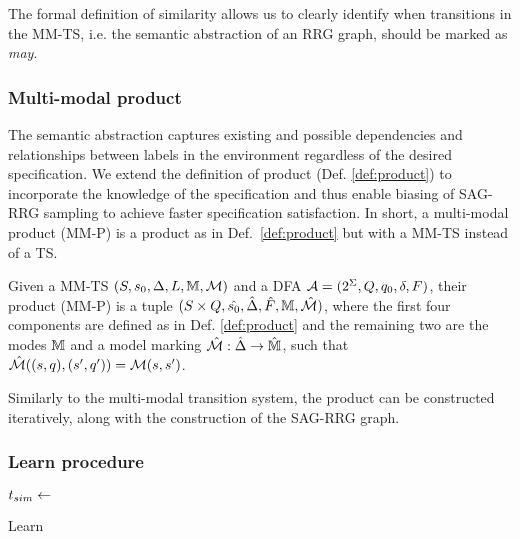 \medskip

The formal definition of similarity allows us to clearly identify when transitions in the MM-TS, i.e. the semantic abstraction of an RRG graph, should be marked as \emph{may}.

\medskip

\subsubsection{Multi-modal product}

The semantic abstraction captures existing and possible dependencies and relationships between labels in the environment regardless of the desired specification. We extend the definition of product (Def. \ref{def:product}) to incorporate the knowledge of the specification and thus enable biasing of SAG-RRG sampling to achieve faster specification satisfaction. In short, a multi-modal product (MM-P) is a product as in Def.~\ref{def:product} but with a MM-TS instead of a TS.

\begin{definition}
    Given a MM-TS $(S,s_0,\Delta,L,\mathbb{M},\mathcal{M})$ and a DFA $\mathcal{A}=(2^\Sigma,Q,q_0,\delta,F)$, their product (MM-P) is a tuple $(S\times Q,\hat{s_0},\hat{\Delta},\hat F, \mathbb{M}, \hat {\mathcal{M}})$, where the first four components are defined as in Def. \ref{def:product} and the remaining two are the modes $\mathbb{M}$ and a model marking $\hat {\mathcal{M}}: \hat \Delta \rightarrow \hat {\mathbb{M}}$, such that $\hat {\mathcal{M}}((s,q),(s',q')) = \mathcal{M}(s, s')$.
\end{definition}

Similarly to the multi-modal transition system, the product can be constructed iteratively, along with the construction of the SAG-RRG graph. 

\subsubsection{Learn procedure}
\label{sec:learnproc}

\begin{algorithm}[t]
    \small
    \DontPrintSemicolon
    {
         \label{learn:addmust}\;
        $t_{sim} \gets$  \label{learn:similar}\;
        \;
    }
            \label{alg:learn}
            \caption{Learn}
\end{algorithm}

